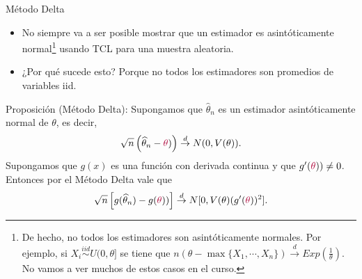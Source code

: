 \documentclass{beamer}
\theoremstyle{definition}
\newcommand{\cw}{\overset{d}{\rightarrow}}
\begin{document}




\begin{frame}{\color{rosee} Método Delta}
\small
\begin{itemize}
    \item No siempre va a ser posible mostrar que un estimador es asintóticamente normal\footnote{De hecho, no todos los estimadores son asintóticamente normales. Por ejemplo, si $X_i\stackrel{iid}{\sim} U(0,\theta]$ se tiene que $n(\theta -\max\{X_1, \cdots , X_n\}) \cw Exp\left(\frac{1}{\theta}\right)$. No vamos a ver muchos de estos casos en el curso.} usando TCL para una muestra aleatoria.
    
    \item ¿Por qué sucede esto? Porque no todos los estimadores son promedios de variables iid.
\end{itemize}
     
 Proposición (Método Delta): Supongamos que $\widehat{\theta}_{n}$ es un estimador asintóticamente normal de $\theta$, es decir,
    $$
    \sqrt{n} \left( \widehat{\theta}_{n} - \color{rosee}\theta\color{black}) \right) \cw N(0,
    V(\theta)).
    $$
    Supongamos que $g(x)$ es una funci\'on con derivada continua y que
    $g^{\prime}(\color{rosee}\theta\color{black}))\neq 0$. Entonces por el Método Delta vale que
    \[\sqrt{n} \left[ g(\widehat{\theta}_{n}) - g(\color{rosee}\theta\color{black})) \right] \cw N[0,
    V(\theta) (g^{\prime}(\color{rosee}\theta\color{black}))^{2}].\]

\end{frame}
\end{document}
